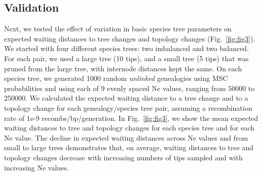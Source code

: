 \documentclass[11pt]{article}
\begin{document}

\subsection{Validation}
Next, we tested the effect of variation in basic species tree parameters on expected waiting 
distances to tree changes and topology changes (Fig.~\ref{fig:fig3}). We started with four 
different species trees: two imbalanced and two balanced. For each pair, we used a large tree 
(10 tips), and a small tree (5 tips) that was pruned from the large tree, with internode 
distances kept the same. On each species tree, we generated 1000 random \emph{unlinked} 
genealogies using MSC probabilities and using 
each of 9 evenly spaced Ne values, ranging from 50000 to 250000. We calculated the expected 
waiting distance 
to a tree change and to a topology change for each genealogy/species tree pair, assuming a 
recombination rate of 1e-9 recombs/bp/generation. In Fig.~\ref{fig:fig3}, we show the mean 
expected waiting distances to tree and topology changes for each species tree and for each Ne 
value. The decline in expected waiting distances across Ne values and from small to large 
trees demonstrates that, on average, waiting distances to tree and topology changes decrease 
with increasing numbers of tips sampled and with increasing Ne values. 
\end{document}
